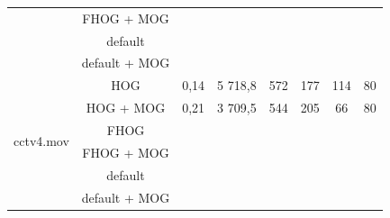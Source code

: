 \begin{table}[H]
\begin{tabular}{|c|c|c|c|c|c|c|c|}
                         & FHOG + MOG 		&         &               	  &    &    &    &          \\ \cline{2-8} 
                         & default	 		&         &               	  &    &    &    &          \\ \cline{2-8} 
                         & default + MOG 	&         &               	  &    &    &    &          \\ \hline \hline
\multirow{6}{*}{cctv4.mov} & HOG        	&  0,14   &   5 718,8     	  & 572	  & 177  & 114  &   80		    \\ \cline{2-8} 
                         & HOG + MOG  		&  0,21   &   3 709,5      	  & 544   & 205  & 66   &   80          \\ \cline{2-8} 
                         & FHOG       		&         &               	  &    &    &    &          \\ \cline{2-8} 
                         & FHOG + MOG 		&         &               	  &    &    &    &          \\ \cline{2-8} 
                         & default	 		&         &               	  &    &    &    &          \\ \cline{2-8} 
                         & default + MOG 	&         &               	  &    &    &    &          \\ \hline
\end{tabular}
\end{table}

